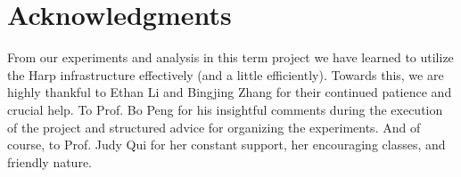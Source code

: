 \documentclass{sig-alternate-05-2015}
\begin{document}
\section{Acknowledgments}
From our experiments and analysis in this term project we have learned to utilize the Harp infrastructure effectively (and a little efficiently). Towards this, we are highly thankful to Ethan Li and Bingjing Zhang for their continued patience and crucial help. To Prof. Bo Peng for his insightful comments during the execution of the project and structured advice for organizing the experiments. And of course, to Prof. Judy Qui for her constant support, her encouraging classes, and friendly nature. 


  
\end{document}
